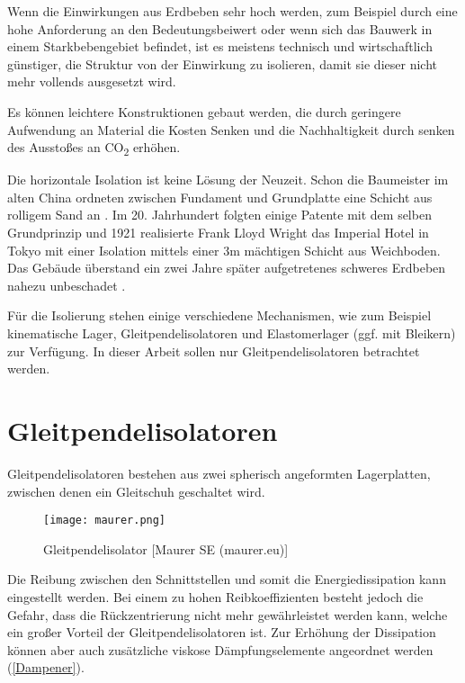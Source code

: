 Wenn die Einwirkungen aus Erdbeben sehr hoch werden, zum Beispiel durch eine hohe Anforderung an den Bedeutungsbeiwert oder wenn sich das Bauwerk in einem Starkbebengebiet befindet, ist es meistens technisch und wirtschaftlich günstiger, die Struktur von der Einwirkung zu isolieren, damit sie dieser nicht mehr vollends ausgesetzt wird.

Es können leichtere Konstruktionen gebaut werden, die durch geringere Aufwendung an Material die Kosten Senken und die Nachhaltigkeit durch senken des Ausstoßes an CO\textsubscript{2} erhöhen.

Die horizontale Isolation ist keine Lösung der Neuzeit. Schon die Baumeister im alten China ordneten zwischen Fundament und Grundplatte eine Schicht aus rolligem Sand an \cite{Taylor}.
Im 20. Jahrhundert folgten einige Patente mit dem selben Grundprinzip und 1921 realisierte Frank Lloyd Wright das Imperial Hotel in Tokyo mit einer Isolation mittels einer 3m mächtigen Schicht aus Weichboden. Das Gebäude überstand ein zwei Jahre später aufgetretenes schweres Erdbeben nahezu unbeschadet \cite{Reitherman}.

Für die Isolierung stehen einige verschiedene Mechanismen, wie zum Beispiel kinematische Lager, Gleitpendelisolatoren und Elastomerlager (ggf. mit Bleikern) zur Verfügung.
In dieser Arbeit sollen nur Gleitpendelisolatoren betrachtet werden.

\pagebreak

\section{Gleitpendelisolatoren}
\label{sec:gleitisolatoren}

 Gleitpendelisolatoren bestehen aus zwei spherisch angeformten Lagerplatten, zwischen denen ein Gleitschuh geschaltet wird.

\begin{figure}[H]
    \centering
    \texttt{[image: maurer.png]}
    \caption{Gleitpendelisolator [Maurer SE (maurer.eu)]}
\end{figure}

Die Reibung zwischen den Schnittstellen und somit die Energiedissipation kann eingestellt werden.
Bei einem zu hohen Reibkoeffizienten besteht jedoch die Gefahr, dass die Rückzentrierung nicht mehr gewährleistet werden kann, welche ein großer Vorteil der Gleitpendelisolatoren ist.
Zur Erhöhung der Dissipation können aber auch zusätzliche viskose Dämpfungselemente angeordnet werden (\cref{Dampener}).

